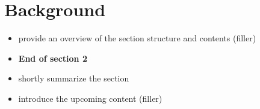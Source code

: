 \section{Background}
\label{sec:02_background}

\begin{itemize}
  \item provide an overview of the section structure and contents (filler)
\end{itemize}





\begin{itemize}
  \item \textbf{End of section 2}
  \item shortly summarize the section
  \item introduce the upcoming content (filler)
\end{itemize}
